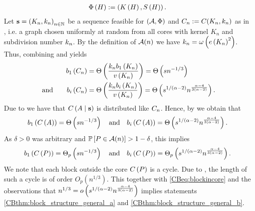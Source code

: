 \begin{align*}
\Phi\left(H\right):=\left(K\left(H\right), S\left(H\right)\right).
\end{align*}
Let $\mathbf{s}=\left(K_n, k_n\right)_{n\in \mathbb{N}}$ be a sequence feasible for $\left(\mathcal{A}, \Phi\right)$ and $C_n:=C(K_n, k_n)$ as in , i.e. a graph chosen uniformly at random from all cores with kernel $K_n$ and subdivision number $k_n$. By the definition of $\mathcal{A}(n)$ we have $k_n=\omega\left(e\left({K_n}\right)^2\right)$. Thus, combining  and  yields 
\begin{align*}
b_{1}\left(C_n\right)&=\Theta\left(\frac{k_nb_{1}\left(K_n\right)}{v\left({K_n}\right)}\right)=\Theta\left(sn^{-1/3}\right)\\
\text{ and }~~~~~b_{i}\left(C_n\right)&=\Theta\left(\frac{k_nb_{i}\left(K_n\right)}{v\left({K_n}\right)}\right)=\Theta\left(s^{1/\left(\alpha-2\right)}n^{\frac{\alpha-4}{3(\alpha-2)}}\right).
\end{align*}
Due to  we have that $C\left(A \mid \mathbf{s}\right)$ is distributed like $C_n$. Hence, by  we obtain that \whp\
\begin{align*}
b_{1}\left(C\left(A\right)\right)=\Theta\left(sn^{-1/3}\right) 
\quad \text{and}\quad b_{i}\left(C\left(A\right)\right)=\Theta\left(s^{1/\left(\alpha-2\right)}n^{\frac{\alpha-4}{3(\alpha-2)}}\right).
\end{align*}
As $\delta>0$ was arbitrary and $\mathbb{P}\left[P \in \mathcal{A}(n)\right]>1-\delta$, this implies
\begin{align}\label{CBeq:blockincore}
	b_{1}\left(C\left(P\right)\right)=\Theta_p\left(sn^{-1/3}\right) 
	\quad \text{and}\quad b_{i}\left(C\left(P\right)\right)=\Theta_p\left(s^{1/\left(\alpha-2\right)}n^{\frac{\alpha-4}{3(\alpha-2)}}\right).
\end{align}
We note that each block outside the core $C\left(P\right)$ is a cycle. Due to , the length of such a cycle is of order $O_p\left(n^{1/3}\right)$. This together with \eqref{CBeq:blockincore} and the observations that $n^{1/3}=o\left(s^{1/\left(\alpha-2\right)}n^{\frac{\alpha-4}{3(\alpha-2)}}\right)$ implies statements \ref{CBthm:block_structure_general_a} and \ref{CBthm:block_structure_general_b}. 

